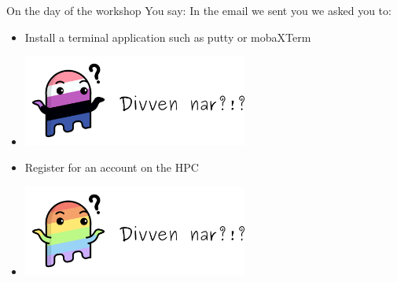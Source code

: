 \begin{frame}{On the day of the workshop}
	You say: In the email we sent you we asked you to:
	\begin{itemize}[label={$\color{UmUBlue}\bullet$}]
		\item<+-> Install a terminal application such as putty or mobaXTerm
		\item<+-> \includegraphics[height=3cm]{graphics/divvinnar1.png}		
		\item<+-> Register for an account on the HPC
		\item<+-> \includegraphics[height=3cm]{graphics/divvinnar2.png}
	\end{itemize}
\end{frame}


